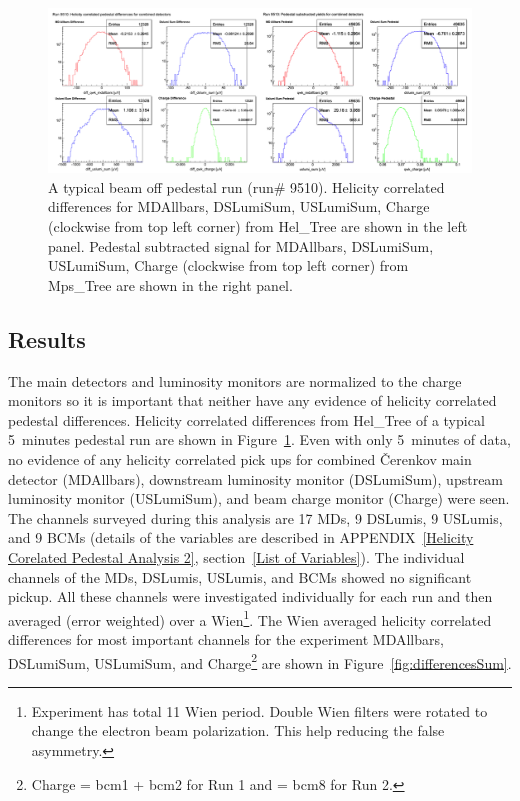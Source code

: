 \begin{singlespace}
\begin{figure}[!h]
	\centering
	\begin{center}
	\includegraphics[width=15.0cm]{figures/run}
	\end{center}
	\caption
	{A typical beam off pedestal run (run\# 9510). Helicity correlated differences for MDAllbars, DSLumiSum, USLumiSum, Charge (clockwise from top left corner) from Hel\_Tree are shown in the left panel. Pedestal subtracted signal for MDAllbars, DSLumiSum, USLumiSum, Charge (clockwise from top left corner) from Mps\_Tree are shown in the right panel.}
	\label{fig:run_hel_tree}
\end{figure}
\end{singlespace}


\subsection{Results}
\label{Results}
The main detectors and luminosity monitors are normalized to the charge monitors so it is important that neither have any evidence of helicity correlated pedestal differences. Helicity correlated differences from Hel\_Tree of a typical 5~minutes pedestal run are shown in Figure~\ref{fig:run_hel_tree}. Even with only 5~minutes of data, no evidence of any helicity correlated pick ups for combined \v{C}erenkov main detector (MDAllbars), downstream luminosity monitor (DSLumiSum), upstream luminosity monitor (USLumiSum), and beam charge monitor (Charge) were seen. 
The channels surveyed during this analysis are 17 MDs, 9 DSLumis, 9 USLumis, and 9 BCMs (details of the variables are described in APPENDIX~\ref{Helicity Corelated Pedestal Analysis 2}, section~\ref{List of Variables}). The individual channels of the MDs, DSLumis, USLumis, and BCMs showed no significant pickup. All these channels were investigated individually for each run and then averaged (error weighted) over a Wien\footnote{Experiment has total 11 Wien period. Double Wien filters were rotated to change the electron beam polarization. This help reducing the false asymmetry.}.
The Wien averaged helicity correlated differences for most important channels for the experiment MDAllbars, DSLumiSum, USLumiSum, and Charge\footnote{Charge = bcm1 + bcm2 for Run 1 and = bcm8 for Run 2.} are shown in Figure~\ref{fig:differencesSum}. 

